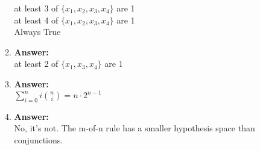 \documentclass[12pt, fullpage,letterpaper]{article}
\begin{document}
\begin{enumerate}
\begin{enumerate}
\begin{multicols}{2}
at least 3 of $\{x_1, x_2, x_3, x_4\}$ are 1\\
at least 4 of $\{x_1, x_2, x_3, x_4\}$ are 1\\
Always True
\end{multicols}
\item \textbf{Answer:}\\
at least 2 of $\{x_1, x_3, x_4\}$ are 1
\item \textbf{Answer:}\\
$\sum_{i=0}^n i{n \choose i}=n\cdot2^{n-1}$
\item \textbf{Answer:}\\
No, it's not. The m-of-n rule has a smaller hypothesis space than conjunctions.
\end{enumerate}
\end{enumerate}
\end{document}
